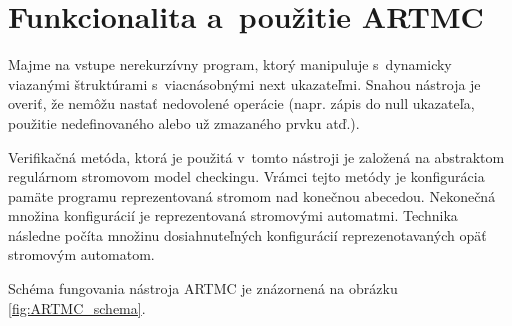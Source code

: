 \section{Funkcionalita a~použitie ARTMC}
Majme na vstupe nerekurzívny program, ktorý manipuluje s~dynamicky viazanými
štruktúrami s~viacnásobnými next ukazateľmi. Snahou nástroja je overiť, že
nemôžu nastať nedovolené operácie (napr. zápis do null ukazateľa, použitie
nedefinovaného alebo už zmazaného prvku atď.)\cite{artmc1}.

Verifikačná metóda, ktorá je použitá v~tomto nástroji je založená na abstraktom
regulárnom stromovom model checkingu. Vrámci tejto metódy je konfigurácia pamäte programu reprezentovaná stromom nad konečnou abecedou. Nekonečná množina konfigurácií je reprezentovaná stromovými automatmi. Technika následne počíta množinu dosiahnuteľných konfigurácií reprezenotavaných opäť stromovým automatom\cite{artmc2}.

Schéma fungovania nástroja ARTMC je znázornená na obrázku \ref{fig:ARTMC_schema}.


